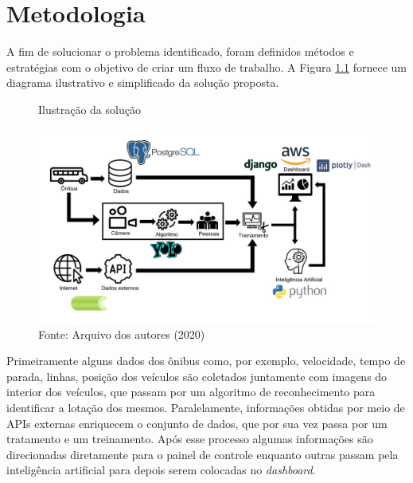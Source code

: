 \chapter{Metodologia}
\label{Cap:MateriaisMetodos}

\indent
\par A fim de solucionar o problema identificado, foram definidos métodos e estratégias com o objetivo de criar um fluxo de trabalho. A Figura \ref{DiagramaDeBlocosIcones} fornece um diagrama ilustrativo e simplificado da solução proposta.

\begin{figure}[H]
    \centering
    \caption{Ilustração da solução}
    \includegraphics[width=1.0\linewidth]{Imagens/DiagramaDeBlocosIcones.jpg}
    \caption*{Fonte: Arquivo dos autores (2020)}
    \label{DiagramaDeBlocosIcones}
\end{figure}

\indent
\par Primeiramente alguns dados dos ônibus como, por exemplo, velocidade, tempo de parada, linhas, posição dos veículos são coletados juntamente com imagens do interior dos veículos, que passam por um algoritmo de reconhecimento para identificar a lotação dos mesmos. Paralelamente, informações obtidas por meio de APIs externas enriquecem o conjunto de dados, que por sua vez passa por um tratamento e um treinamento. Após esse processo algumas informações são direcionadas diretamente para o painel de controle enquanto outras passam pela inteligência artificial para depois serem colocadas no \textit{dashboard}.

